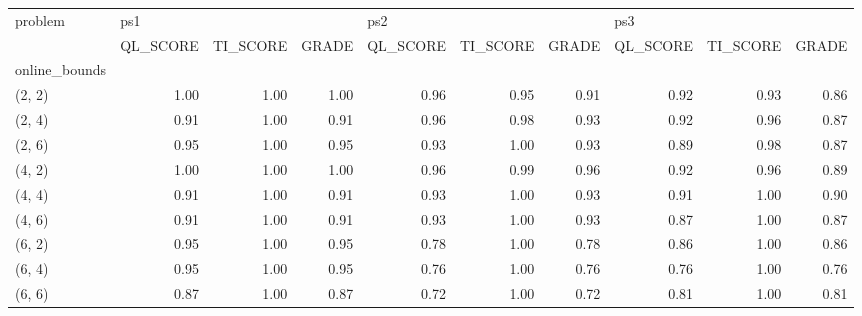 \begin{tabular}{lrrrrrrrrr}
\toprule
problem & \multicolumn{3}{l}{ps1} & \multicolumn{3}{l}{ps2} & \multicolumn{3}{l}{ps3} \\
{} & QL\_SCORE & TI\_SCORE & GRADE & QL\_SCORE & TI\_SCORE & GRADE & QL\_SCORE & TI\_SCORE & GRADE \\
online\_bounds &          &          &       &          &          &       &          &          &       \\
\midrule
(2, 2)        &     1.00 &     1.00 &  1.00 &     0.96 &     0.95 &  0.91 &     0.92 &     0.93 &  0.86 \\
(2, 4)        &     0.91 &     1.00 &  0.91 &     0.96 &     0.98 &  0.93 &     0.92 &     0.96 &  0.87 \\
(2, 6)        &     0.95 &     1.00 &  0.95 &     0.93 &     1.00 &  0.93 &     0.89 &     0.98 &  0.87 \\
(4, 2)        &     1.00 &     1.00 &  1.00 &     0.96 &     0.99 &  0.96 &     0.92 &     0.96 &  0.89 \\
(4, 4)        &     0.91 &     1.00 &  0.91 &     0.93 &     1.00 &  0.93 &     0.91 &     1.00 &  0.90 \\
(4, 6)        &     0.91 &     1.00 &  0.91 &     0.93 &     1.00 &  0.93 &     0.87 &     1.00 &  0.87 \\
(6, 2)        &     0.95 &     1.00 &  0.95 &     0.78 &     1.00 &  0.78 &     0.86 &     1.00 &  0.86 \\
(6, 4)        &     0.95 &     1.00 &  0.95 &     0.76 &     1.00 &  0.76 &     0.76 &     1.00 &  0.76 \\
(6, 6)        &     0.87 &     1.00 &  0.87 &     0.72 &     1.00 &  0.72 &     0.81 &     1.00 &  0.81 \\
\bottomrule
\end{tabular}
